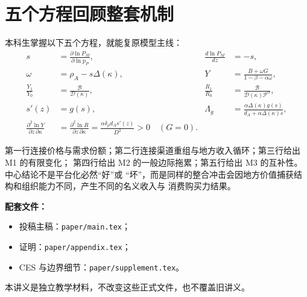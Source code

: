 \documentclass[UTF8,11pt,scheme=chinese,fontset=windows]{ctexart}
\newcommand{\calB}{\mathcal B}
\newcommand{\calD}{\mathcal D}
\newcommand{\calP}{\mathcal P}
\theoremstyle{definition}
\begin{document}
\section{五个方程回顾整套机制}

本科生掌握以下五个方程，就能复原模型主线：
\begin{align*}
s&=\frac{\partial\ln P_M}{\partial\ln p_P},
&\frac{d\ln P_M}{dz}&=-s,\\
\omega&=\rho_A-s\Delta(\kappa),
&Y&=\frac{B+\omega G}{1-\beta-\alpha\omega},\\
\frac{Y_1}{Y_0}&=\frac{\calB}{\calD(\kappa)},
&\frac{R_1}{R_0}&=\frac{\calB}{\calD(\kappa)\calP^\alpha},\\
s'(z)&=g(s),
&\Lambda_g&=\frac{\alpha\Delta(\kappa)g(s)}
{d_A+\alpha\Delta(\kappa)s},\\
\frac{\partial^2\ln Y}{\partial z\,\partial\kappa}
&=\frac{\partial^2\ln R}{\partial z\,\partial\kappa}
=\frac{\alpha\delta_\rho d_A s'(z)}{D^2}>0\quad(G=0).
\end{align*}

第一行连接价格与需求份额；第二行连接渠道重组与地方收入循环；第三行给出 M1 的有限变化；
第四行给出 M2 的一般边际拖累；第五行给出 M3 的互补性。中心结论不是平台化必然“好”或
“坏”，而是同样的整合冲击会因地方价值捕获结构和组织能力不同，产生不同的名义收入与
消费购买力结果。

\bigskip
\noindent\textbf{配套文件：}
\begin{itemize}[leftmargin=2em,itemsep=0.1em,topsep=0.2em]
  \item 投稿主稿：\texttt{paper/main.tex}；
  \item 证明：\texttt{paper/appendix.tex}；
  \item CES 与边界细节：\texttt{paper/supplement.tex}。
\end{itemize}
本讲义是独立教学材料，不改变这些正式文件，也不覆盖旧讲义。
\end{document}
